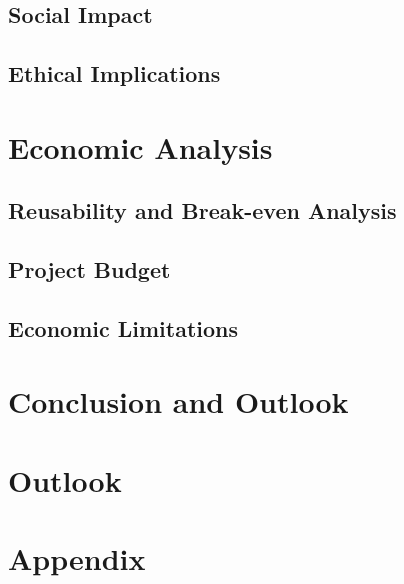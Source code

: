 \documentclass[12pt,a4paper]{report}
\begin{document}
\section{Social Impact}
\section{Ethical Implications}
\chapter{Economic Analysis}
\section{Reusability and Break-even Analysis}
\section{Project Budget} 
\section{Economic Limitations}

\chapter{Conclusion and Outlook}


\chapter{Outlook}



\chapter*{Appendix}
\setcounter{page}{7}
\listoftables
\end{document}
